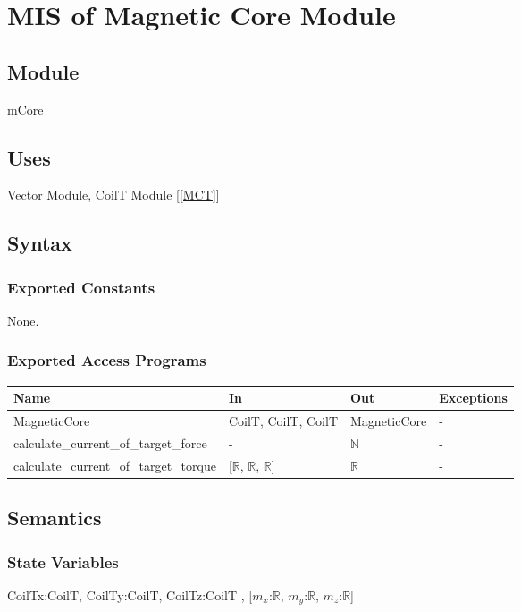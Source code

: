 \documentclass[12pt, titlepage]{article}
\begin{document}
\section{MIS of Magnetic Core Module} \label{MMC}

\subsection{Module}
mCore

\subsection{Uses}
Vector Module, CoilT Module [\ref{MCT}]

\subsection{Syntax}

\subsubsection{Exported Constants}
None.
\subsubsection{Exported Access Programs}

\begin{center}
\begin{tabular}{p{6cm} p{4cm} p{3cm} p{2cm}}
\hline
\textbf{Name} & \textbf{In} & \textbf{Out} & \textbf{Exceptions} \\
\hline
MagneticCore  & CoilT, CoilT, CoilT & MagneticCore   & - \\
\hline
calculate\_current\_of\_target\_force & - & $\mathbb{N}$  & -  \\
\hline
calculate\_current\_of\_target\_torque & [$\mathbb{R}$, $\mathbb{R}$, $\mathbb{R}$] & $\mathbb{R}$  & -  \\
\hline
\end{tabular}
\end{center}

\subsection{Semantics}

\subsubsection{State Variables}
CoilTx:CoilT,  CoilTy:CoilT,  CoilTz:CoilT , [$m_x$:$\mathbb{R}$, $m_y$:$\mathbb{R}$, $m_z$:$\mathbb{R}$]
\end{document}
